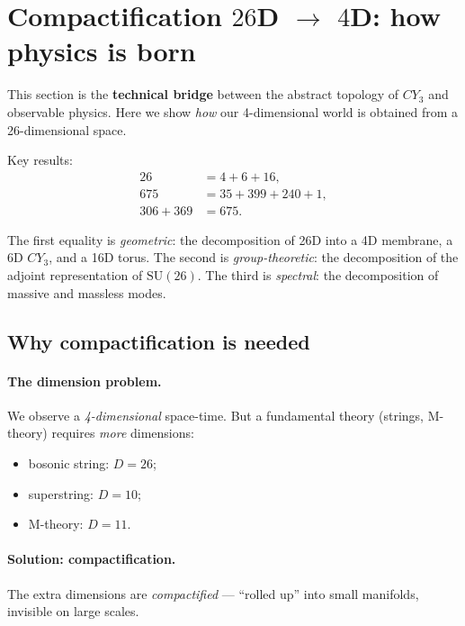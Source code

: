 \documentclass[11pt,a4paper]{article}
\newcommand{\SU}{\mathrm{SU}}
\newcommand{\CY}{CY_3}
\theoremstyle{definition}
\begin{document}
\section{Compactification $26$D $\to$ $4$D: how physics is born}
\label{sec:compactification}

This section is the \textbf{technical bridge} between the abstract 
topology of $\CY$ and observable physics. Here we show 
\emph{how} our 4-dimensional world is obtained from a 26-dimensional 
space.

Key results:
\begin{align}
    26 &= 4 + 6 + 16, \label{eq:dim-decomp} \\
    675 &= 35 + 399 + 240 + 1, \label{eq:adjoint-decomp} \\
    306 + 369 &= 675. \label{eq:mass-decomp}
\end{align}

The first equality is \emph{geometric}: the decomposition of 26D into 
a 4D membrane, a 6D $\CY$, and a 16D torus. The second is \emph{group-theoretic}: 
the decomposition of the adjoint representation of $\SU(26)$. 
The third is \emph{spectral}: the decomposition of massive and 
massless modes.

\subsection{Why compactification is needed}
\label{subsec:why-compactification}

\paragraph{The dimension problem.}
We observe a \emph{4-dimensional} space-time. But 
a fundamental theory (strings, M-theory) requires 
\emph{more} dimensions:
\begin{itemize}
    \item bosonic string: $D = 26$;
    \item superstring: $D = 10$;
    \item M-theory: $D = 11$.
\end{itemize}

\paragraph{Solution: compactification.}
The extra dimensions are \emph{compactified} — ``rolled up'' 
into small manifolds, invisible on large scales.
\end{document}
